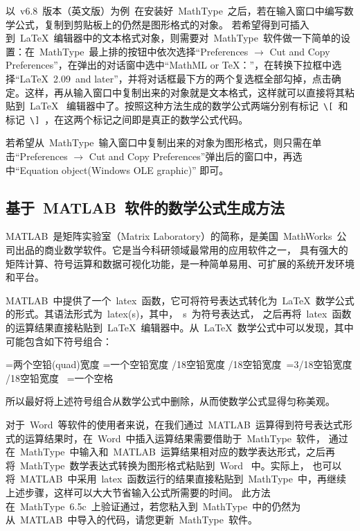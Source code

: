 以~v6.8~版本（英文版）为例~在安装好~MathType~之后，若在输入窗口中编写数学公式，复制到剪贴板上的仍然是图形格式的对象。
若希望得到可插入到~\LaTeX~编辑器中的文本格式对象，则需要对~MathType~软件做一下简单的设置：在~MathType~最上排的按钮中依次选择“Preferences
$\rightarrow$ Cut and Copy Preferences”，在弹出的对话窗中选中“MathML or TeX：”，在转换下拉框中选择“LaTeX~2.09~and later”，并将对话框最下方的两个复选框全部勾掉，点击确定。这样，再从输入窗口中复制出来的对象就是文本格式，这样就可以直接将其粘贴到~\LaTeX~
编辑器中了。按照这种方法生成的数学公式两端分别有标记~\verb|\[|~和标记~\verb|\]|~，在这两个标记之间即是真正的数学公式代码。

若希望从~MathType~输入窗口中复制出来的对象为图形格式，则只需在单击“Preferences
$\rightarrow$ Cut and Copy Preferences”弹出后的窗口中，再选中“Equation object(Windows OLE graphic)” 即可。

\subsection{基于~MATLAB~软件的数学公式生成方法}


MATLAB~是矩阵实验室（Matrix Laboratory）的简称，是美国~MathWorks~公司出品的商业数学软件。它是当今科研领域最常用的应用软件之一，
具有强大的矩阵计算、符号运算和数据可视化功能，是一种简单易用、可扩展的系统开发环境和平台。


MATLAB~中提供了一个~latex~函数，它可将符号表达式转化为~\LaTeX~数学公式的形式。其语法形式为~latex(s)，其中，~s~为符号表达式，
之后再将~latex~函数的运算结果直接粘贴到~\LaTeX~编辑器中。从~\LaTeX~数学公式中可以发现，其中可能包含如下符号组合：

\begin{verbatim*}
\qquad=两个空铅(quad)宽度
\quad=一个空铅宽度
/18空铅宽度
/18空铅宽度
\,=3/18空铅宽度
/18空铅宽度
\ =一个空格
\end{verbatim*}

所以最好将上述符号组合从数学公式中删除，从而使数学公式显得匀称美观。

对于~Word~等软件的使用者来说，在我们通过~MATLAB~运算得到符号表达式形式的运算结果时，在~Word~中插入运算结果需要借助于~MathType~软件，
通过在~MathType~中输入和~MATLAB~运算结果相对应的数学表达形式，之后再将~MathType~数学表达式转换为图形格式粘贴到~Word~ 中。实际上，
也可以将~MATLAB~中采用~latex~函数运行的结果直接粘贴到~MathType~中，再继续上述步骤，这样可以大大节省输入公式所需要的时间。
此方法在~MathType~6.5c~上验证通过，若您粘入到~MathType~中的仍然为从~MATLAB~中导入的代码，请您更新~MathType~软件。

